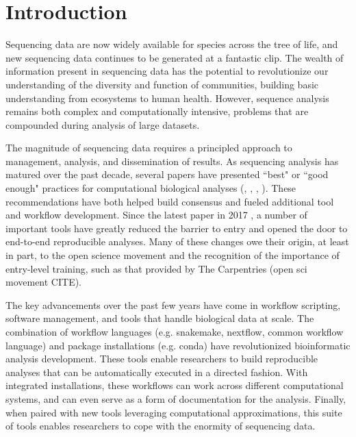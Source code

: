 \documentclass[10pt,letterpaper]{article}
\begin{document}
\linenumbers

\section*{Introduction}

Sequencing data are now widely available for species across the tree of life, and new sequencing data continues to be generated at a fantastic clip. %
The wealth of information present in sequencing data has the potential to revolutionize our understanding of the diversity and function of communities, building basic understanding from ecosystems to human health.
However, sequence analysis remains both complex and computationally intensive, problems that are compounded during analysis of large datasets.

The magnitude of sequencing data requires a principled approach to management, analysis, and dissemination of results.
As sequencing analysis has matured over the past decade, several papers have presented ``best" or ``good enough" practices for computational biological analyses (\cite{aruliah2012best}, \cite{wilson2014best}, \cite{shade2015roadmap}, \cite{wilson2017good}).
These recommendations have both helped build consensus and fueled additional tool and workflow development.
Since the latest paper in 2017 \cite{wilson2017good}, a number of important tools have greatly reduced the barrier to entry and opened the door to end-to-end reproducible analyses. %
Many of these changes owe their origin, at least in part, to the open science movement and the recognition of the importance of entry-level training, such as that provided by The Carpentries \cite{teal2015data} (open sci movement CITE).

The key advancements over the past few years have come in workflow scripting, software management, and tools that handle biological data at scale. %
The combination of workflow languages (e.g. snakemake, nextflow, common workflow language) and package installations (e.g. conda) have revolutionized bioinformatic analysis development.
These tools enable researchers to build reproducible analyses that can be automatically executed in a directed fashion. 
With integrated installations, these workflows can work across different computational systems, and can even serve as a form of documentation for the analysis.
Finally, when paired with new tools leveraging computational approximations, this suite of tools enables researchers to cope with the enormity of sequencing data.
\end{document}
